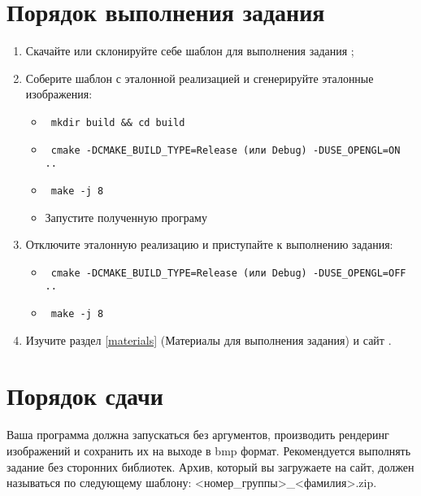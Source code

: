 \documentclass[12pt,subf,href,colorlinks=true]{article}
\begin{document}
\section{Порядок выполнения задания}

\begin{enumerate}
\item Скачайте или склонируйте себе шаблон для выполнения задания \cite{ourtemplate};

\item Соберите шаблон с эталонной реализацией и сгенерируйте эталонные изображения:
  \begin{itemize}
  \item \begin{verbatim} mkdir build && cd build \end{verbatim}
  \item \begin{verbatim} cmake -DCMAKE_BUILD_TYPE=Release (или Debug) -DUSE_OPENGL=ON .. \end{verbatim}
  \item \begin{verbatim} make -j 8 \end{verbatim}
  \item Запустите полученную програму
  \end{itemize}

\item Отключите эталонную реализацию и приступайте к выполнению задания:
   \begin{itemize}
  	\item \begin{verbatim} cmake -DCMAKE_BUILD_TYPE=Release (или Debug) -DUSE_OPENGL=OFF .. \end{verbatim}
  	\item \begin{verbatim} make -j 8 \end{verbatim}
  \end{itemize}

\item Изучите раздел \ref{materials} (Материалы для выполнения задания) и сайт \cite{scratchpixel}.

\end{enumerate}

\section{Порядок сдачи}
Ваша программа должна запускаться без аргументов, производить рендеринг изображений и сохранить их на выходе в bmp формат. Рекомендуется выполнять задание без сторонних библиотек.
Архив, который вы загружаете на сайт, должен называться по следующему шаблону: <номер\_группы>\_<фамилия>.zip.
\end{document}
